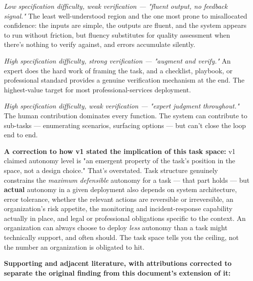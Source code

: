 \emph{Low specification difficulty, weak verification --- "fluent output, no feedback signal."} The least well-understood region and the one most prone to misallocated confidence: the inputs are simple, the outputs are fluent, and the system appears to run without friction, but fluency substitutes for quality assessment when there's nothing to verify against, and errors accumulate silently.

\emph{High specification difficulty, strong verification --- "augment and verify."} An expert does the hard work of framing the task, and a checklist, playbook, or professional standard provides a genuine verification mechanism at the end. The highest-value target for most professional-services deployment.

\emph{High specification difficulty, weak verification --- "expert judgment throughout."} The human contribution dominates every function. The system can contribute to sub-tasks --- enumerating scenarios, surfacing options --- but can't close the loop end to end.

\textbf{A correction to how v1 stated the implication of this task space:} v1 claimed autonomy level is "an emergent property of the task's position in the space, not a design choice." That's overstated. Task structure genuinely constrains the \emph{maximum defensible} autonomy for a task --- that part holds --- but \textbf{actual} autonomy in a given deployment also depends on system architecture, error tolerance, whether the relevant actions are reversible or irreversible, an organization's risk appetite, the monitoring and incident-response capability actually in place, and legal or professional obligations specific to the context. An organization can always choose to deploy \emph{less} autonomy than a task might technically support, and often should. The task space tells you the ceiling, not the number an organization is obligated to hit.

\textbf{Supporting and adjacent literature, with attributions corrected to separate the original finding from this document's extension of it:}

